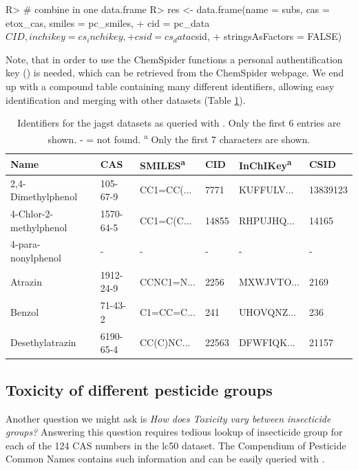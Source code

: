 \documentclass[article, shortnames]{jss}\usepackage[]{graphicx}\usepackage[]{color}
\begin{document}
\begin{CodeChunk}
\begin{CodeInput}
R> # combine in one data.frame
R> res <- data.frame(name = subs, cas = etox_cas, smiles = pc_smiles, 
+                    cid = pc_data$CID, inchikey = cs_inchikey, 
+                    csid = cs_data$csid, 
+                    stringsAsFactors = FALSE)
\end{CodeInput}
\end{CodeChunk}

Note, that in order to use the ChemSpider functions a personal authentification key () is needed, which can be retrieved from the ChemSpider webpage. 
We end up with a compound table containing many different identifiers, allowing easy identification and merging with other datasets (Table \ref{tab:comptable}).

\begin{table}[ht]
\centering
\begin{CodeChunk}
\begin{tabular}{llllll}
  \toprule
Name & CAS & SMILES\textsuperscript{a} & CID & InChIKey\textsuperscript{a} & CSID \\ 
  \midrule
2,4-Dimethylphenol & 105-67-9 & CC1=CC(... & 7771 & KUFFULV... & 13839123 \\ 
  4-Chlor-2-methylphenol & 1570-64-5 & CC1=C(C... & 14855 & RHPUJHQ... & 14165 \\ 
  4-para-nonylphenol & - & - & - & - & - \\ 
  Atrazin & 1912-24-9 & CCNC1=N... & 2256 & MXWJVTO... & 2169 \\ 
  Benzol & 71-43-2 & C1=CC=C... & 241 & UHOVQNZ... & 236 \\ 
  Desethylatrazin & 6190-65-4 & CC(C)NC... & 22563 & DFWFIQK... & 21157 \\ 
   \bottomrule
\end{tabular}
\end{CodeChunk}
\caption{Identifiers for the jagst datasets as queried with . Only the first 6 entries are shown. - = not found. \textsuperscript{a} Only the first 7 characters are shown.}
\label{tab:comptable}
\end{table}


\subsection[Toxicity of different pesticide groups]{Toxicity of different pesticide groups}
Another question we might ask is \emph{How does Toxicity vary between insecticide groups?}
Answering this question requires tedious lookup of insecticide group for each of the 124 CAS numbers in the lc50 dataset.
The Compendium of Pesticide Common Names \citep{wood} contains such information and can be easily queried with .
\end{document}
